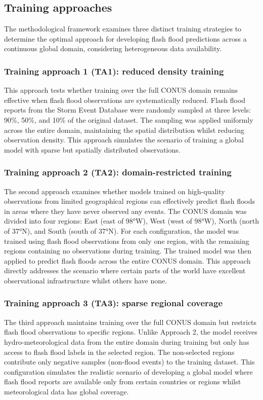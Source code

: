 \subsection{Training approaches}
The methodological framework examines three distinct training strategies to determine the optimal approach for developing flash flood predictions across a continuous global domain, considering heterogeneous data availability. 

\subsubsection{Training approach 1 (TA1): reduced density training}
This approach tests whether training over the full CONUS domain remains effective when flash flood observations are systematically reduced. Flash flood reports from the Storm Event Database were randomly sampled at three levels: 90\%, 50\%, and 10\% of the original dataset. The sampling was applied uniformly across the entire domain, maintaining the spatial distribution whilst reducing observation density. This approach simulates the scenario of training a global model with sparse but spatially distributed observations.

\subsubsection{Training approach 2 (TA2): domain-restricted training}
The second approach examines whether models trained on high-quality observations from limited geographical regions can effectively predict flash floods in areas where they have never observed any events. The CONUS domain was divided into four regions: East (east of 98°W), West (west of 98°W), North (north of 37°N), and South (south of 37°N). For each configuration, the model was trained using flash flood observations from only one region, with the remaining regions containing no observations during training. The trained model was then applied to predict flash floods across the entire CONUS domain. This approach directly addresses the scenario where certain parts of the world have excellent observational infrastructure whilst others have none.

\subsubsection{Training approach 3 (TA3): sparse regional coverage}
The third approach maintains training over the full CONUS domain but restricts flash flood observations to specific regions. Unlike Approach 2, the model receives hydro-meteorological data from the entire domain during training but only has access to flash flood labels in the selected region. The non-selected regions contribute only negative samples (non-flood events) to the training dataset. This configuration simulates the realistic scenario of developing a global model where flash flood reports are available only from certain countries or regions whilst meteorological data has global coverage.

